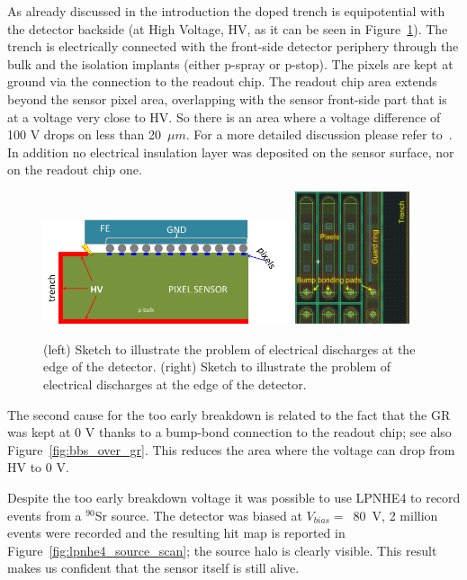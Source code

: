 As already discussed in the introduction the doped trench is equipotential with the detector backside (at High Voltage, HV, as it can be seen in Figure~\ref{fig:sparks}). The trench is electrically connected with the front-side detector periphery through the bulk 
and the isolation implants (either p-spray or p-stop). The pixels are kept at ground via the connection to the readout chip. The readout chip area extends beyond the sensor pixel area, overlapping with the sensor front-side part that is at a voltage very close to HV. So there is an area 
where a voltage difference of 100 V drops on less than 20~$\mu m$. For a more detailed discussion please refer to~\cite{rossi2006pixel}. In addition no electrical insulation layer was deposited on the sensor 
surface, nor on the readout chip one.
\begin{figure}[!htb]
\centering
\includegraphics[width=0.65\textwidth]{sparks.png}
\includegraphics[width=0.3\textwidth]{bbs_over_gr.png}
\caption{\label{fig:sparks}(left) Sketch to illustrate the problem of electrical discharges at the edge of the detector. (right) Sketch to illustrate the problem of electrical discharges at the edge of the detector.}
\end{figure}
The second cause for the too early breakdown is related to the fact that 
the GR was kept at 0 V thanks to a bump-bond connection to the 
readout chip; see also Figure~\ref{fig:bbs_over_gr}. This reduces the area where the voltage can drop from HV to 0 V. 




Despite the too early breakdown voltage it was possible to use LPNHE4 to record events from a  $^{90}$Sr source. The detector was biased at  
$V_{bias} = $~80~V, 2 million events were recorded and the resulting 
hit map is reported in Figure~\ref{fig:lpnhe4_source_scan}; the source halo is clearly visible. This result makes us confident that the sensor itself is still alive.

